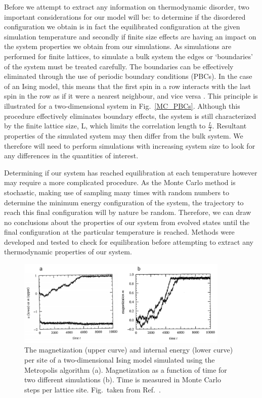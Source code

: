 \documentclass[11pt, twoside]{report}
\begin{document}
Before we attempt to extract any information on thermodynamic disorder, two important considerations for our model will be: to determine if the disordered configuration we obtain is in fact the equilibrated configuration at the given simulation temperature and secondly if finite size effects are having an impact on the system properties we obtain from our simulations.
As simulations are performed for finite lattices, to simulate a bulk system the edges or `boundaries' of the system must be treated carefully. The boundaries can be effectively eliminated through the use of periodic boundary conditions (PBCs). In the case of an Ising model, this means that the first spin in a row interacts with the last spin in the row as if it were a nearest neighbour, and vice versa \cite{MC_Landau}. This principle is illustrated for a two-dimensional system in Fig.~\ref{MC_PBCs}. Although this procedure effectively eliminates boundary effects, the system is still characterized by the finite lattice size, L, which limits the correlation length to $\frac{L}{2}$. Resultant properties of the simulated system may then differ from the bulk system. We therefore will need to perform simulations with increasing system size to look for any differences in the quantities of interest.

Determining if our system has reached equilibration at each temperature however may require a more complicated procedure. As the Monte Carlo method is stochastic, making use of sampling many times with random numbers to determine the minimum energy configuration of the system, the trajectory to reach this final configuration will by nature be random. Therefore, we can draw no conclusions about the properties of our system from evolved states until the final configuration at the particular temperature is reached. Methods were developed and tested to check for equilibration before attempting to extract any thermodynamic properties of our system.

\begin{figure}[h!]
  \centering
    \includegraphics[width=0.9\textwidth]{figures/ising_equil.png}
    \caption[The magnetization (upper curve) and internal energy (lower curve) per site of a two-dimensional Ising model simulated using the Metropolis algorithm (a). Magnetization as a function of time for two different simulations (b). Time is measured in Monte Carlo steps per lattice site.]{The magnetization (upper curve) and internal energy (lower curve) per site of a two-dimensional Ising model simulated using the Metropolis algorithm (a). Magnetization as a function of time for two different simulations (b). Time is measured in Monte Carlo steps per lattice site. Fig.~taken from Ref.~.}
  \label{ising_equil}
\end{figure}
\end{document}
